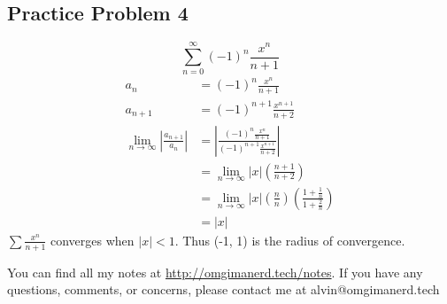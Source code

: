 \documentclass[letterpaper, 12pt]{math}
\begin{document}
\subsection*{Practice Problem 4}
\[ \sum_{n=0}^{\infty}(-1)^{n}\frac{x^{n}}{n+1} \]
\begin{align*}
  a_{n} &= (-1)^{n}\frac{x^{n}}{n+1} \\
  a_{n+1} &= (-1)^{n+1}\frac{x^{n+1}}{n+2} \\
  \lim_{n\to\infty}|\frac{a_{n+1}}{a_{n}}| &=
    |\frac{(-1)^{n}\frac{x^{n}}{n+1}}{(-1)^{n+1}\frac{x^{n+1}}{n+2}}| \\
  &= \lim_{n\to\infty}|x|(\frac{n+1}{n+2}) \\
  &= \lim_{n\to\infty}|x|(\frac{n}{n})(\frac{1+\frac{1}{n}}{1+\frac{2}{n}}) \\
  &= |x|
\end{align*}
\( \sum\frac{x^{n}}{n+1} \) converges when \( |x| < 1 \). Thus (-1, 1)
is the radius of convergence.

\begin{center}
  You can find all my notes at \url{http://omgimanerd.tech/notes}. If you have
  any questions, comments, or concerns, please contact me at
  alvin@omgimanerd.tech
\end{center}
\end{document}
